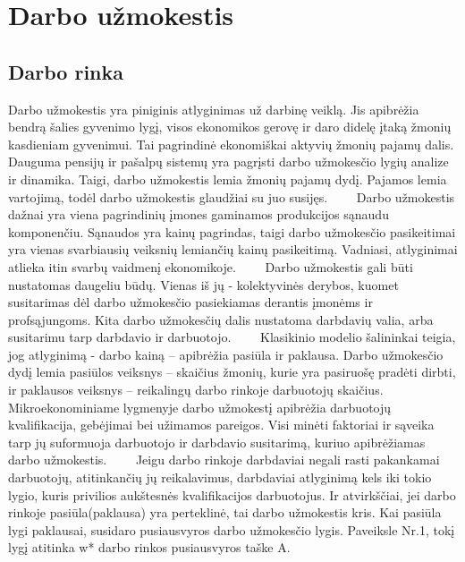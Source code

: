 \documentclass[12pt,a4paper]{article}
\theoremstyle{change}\newtheorem{salyga}{Uždavinys}
\begin{document}
\section{Darbo užmokestis}
\bigskip



\subsection{Darbo rinka}
\medskip
\hspace{40pt}Darbo užmokestis yra piniginis atlyginimas už darbinę veiklą. Jis apibrėžia bendrą šalies gyvenimo lygį, visos ekonomikos gerovę ir daro didelę įtaką žmonių kasdieniam gyvenimui. Tai pagrindinė ekonomiškai aktyvių žmonių pajamų dalis. Dauguma pensijų ir pašalpų sistemų yra pagrįsti darbo užmokesčio lygių analize ir dinamika. Taigi, darbo užmokestis lemia žmonių pajamų dydį. Pajamos lemia vartojimą, todėl darbo užmokestis glaudžiai su juo susijęs.
\vskip 8pt
$\qquad $Darbo užmokestis dažnai yra viena pagrindinių įmones gaminamos produkcijos sąnaudu komponenčiu. Sąnaudos yra kainų pagrindas, taigi darbo užmokesčio pasikeitimai yra vienas svarbiausių veiksnių lemiančių kainų pasikeitimą. Vadniasi, atlyginimai atlieka itin svarbų vaidmenį ekonomikoje.
\vskip 8pt
$\qquad $Darbo užmokestis gali būti nustatomas daugeliu būdų. Vienas iš jų - kolektyvinės derybos, kuomet susitarimas dėl darbo užmokesčio pasiekiamas derantis įmonėms ir profsąjungoms. Kita darbo užmokesčių dalis nustatoma darbdavių valia, arba susitarimu tarp darbdavio ir darbuotojo. 
\vskip 8pt
$\qquad $Klasikinio modelio šalininkai teigia, jog atlyginimą - darbo kainą – apibrėžia pasiūla ir paklausa. Darbo užmokesčio dydį lemia pasiūlos veiksnys – skaičius žmonių, kurie yra pasiruošę pradėti dirbti, ir paklausos veiksnys – reikalingų darbo rinkoje darbuotojų skaičius. Mikroekonominiame lygmenyje darbo užmokestį apibrėžia darbuotojų kvalifikacija, gebėjimai bei užimamos pareigos. Visi minėti faktoriai ir sąveika tarp jų suformuoja darbuotojo ir darbdavio susitarimą, kuriuo apibrėžiamas darbo užmokestis. 
\vskip 8pt
$\qquad $Jeigu darbo rinkoje darbdaviai negali rasti pakankamai darbuotojų, atitinkančių jų reikalavimus, darbdaviai atlyginimą kels iki tokio lygio, kuris privilios aukštesnės kvalifikacijos darbuotojus. Ir atvirkščiai, jei darbo rinkoje pasiūla(paklausa) yra perteklinė, tai darbo užmokestis kris. Kai pasiūla lygi paklausai, susidaro pusiausvyros darbo užmokesčio lygis. Paveiksle Nr.1, tokį lygį atitinka w* darbo rinkos pusiausvyros taške A. 
\vskip 8pt
\end{document}

